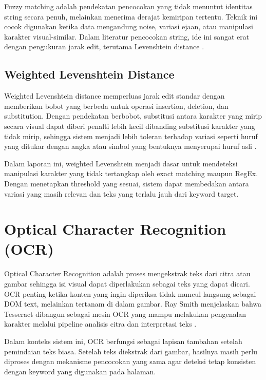 Fuzzy matching adalah pendekatan pencocokan yang tidak menuntut identitas string secara penuh, melainkan menerima derajat kemiripan tertentu. Teknik ini cocok digunakan ketika data mengandung noise, variasi ejaan, atau manipulasi karakter visual-similar. Dalam literatur pencocokan string, ide ini sangat erat dengan pengukuran jarak edit, terutama Levenshtein distance \cite{levenshtein1966binary}.

\subsection{Weighted Levenshtein Distance}

Weighted Levenshtein distance memperluas jarak edit standar dengan memberikan bobot yang berbeda untuk operasi insertion, deletion, dan substitution. Dengan pendekatan berbobot, substitusi antara karakter yang mirip secara visual dapat diberi penalti lebih kecil dibanding substitusi karakter yang tidak mirip, sehingga sistem menjadi lebih toleran terhadap variasi seperti huruf yang ditukar dengan angka atau simbol yang bentuknya menyerupai huruf asli \cite{levenshtein1966binary}.

Dalam laporan ini, weighted Levenshtein menjadi dasar untuk mendeteksi manipulasi karakter yang tidak tertangkap oleh exact matching maupun RegEx. Dengan menetapkan threshold yang sesuai, sistem dapat membedakan antara variasi yang masih relevan dan teks yang terlalu jauh dari keyword target.

\section{Optical Character Recognition (OCR)}

Optical Character Recognition adalah proses mengekstrak teks dari citra atau gambar sehingga isi visual dapat diperlakukan sebagai teks yang dapat dicari. OCR penting ketika konten yang ingin diperiksa tidak muncul langsung sebagai DOM text, melainkan tertanam di dalam gambar. Ray Smith menjelaskan bahwa Tesseract dibangun sebagai mesin OCR yang mampu melakukan pengenalan karakter melalui pipeline analisis citra dan interpretasi teks \cite{smith2007tesseract}.

Dalam konteks sistem ini, OCR berfungsi sebagai lapisan tambahan setelah pemindaian teks biasa. Setelah teks diekstrak dari gambar, hasilnya masih perlu diproses dengan mekanisme pencocokan yang sama agar deteksi tetap konsisten dengan keyword yang digunakan pada halaman.

